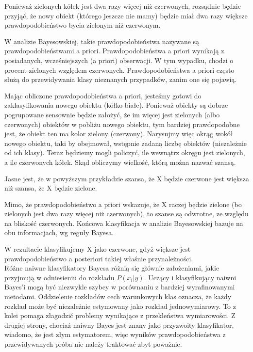 \documentclass[12pt,a4paper]{article}
\begin{document}
            Ponieważ zielonych kółek jest dwa razy więcej niż czerwonych, rozsądnie będzie przyjąć, że nowy obiekt (którego jeszcze nie mamy) będzie miał dwa razy większe prawdopodobieństwo bycia zielonym niż czerwonym.
            
            W analizie Bayesowskiej, takie prawdopodobieństwa nazywane są prawdopodobieństwami a priori. Prawdopodobieństwa a priori wynikają z posiadanych, wcześniejszych (a priori) obserwacji. W tym wypadku, chodzi o procent zielonych względem czerwonych. Prawdopodobieństwa a priori często służą do przewidywania klasy nieznanych przypadków, zanim one się pojawią.
            
            Mając obliczone prawdopodobieństwa a priori, jesteśmy gotowi do zaklasyfikowania nowego obiektu (kółko białe). Ponieważ obiekty są dobrze pogrupowane sensownie będzie założyć, że im więcej jest zielonych (albo czerwonych) obiektów w pobliżu nowego obiektu, tym bardziej prawdopodobne jest, że obiekt ten ma kolor zielony (czerwony). Narysujmy więc okrąg wokół nowego obiektu, taki by obejmował, wstępnie zadaną liczbę obiektów (niezależnie od ich klasy). Teraz będziemy mogli policzyć, ile wewnątrz okręgu jest zielonych, a ile czerwonych kółek. Skąd obliczymy wielkość, którą można nazwać szansą.
            
            Jasne jest, że w powyższym przykładzie szansa, że X będzie czerwone jest większa niż szansa, że X będzie zielone.
            
            Mimo, że prawdopodobieństwo a priori wskazuje, że X raczej będzie zielone (bo zielonych jest dwa razy więcej niż czerwonych), to szanse są odwrotne, ze względu na bliskość czerwonych. Końcowa klasyfikacja w analizie Bayesowskiej bazuje na obu informacjach, wg reguły Bayesa.
            
            W rezultacie klasyfikujemy X jako czerwone, gdyż większe jest prawdopodobieństwo a posteriori takiej właśnie przynależności.\\
            
	        Różne naiwne klasyfikatory Bayesa różnią się głównie założeniami, jakie przyjmują w odniesieniu do rozkładu $P(x_{i}|y)$.
	        Uczący i klasyfikujący naiwni Bayes'i mogą być niezwykle szybcy w porównaniu z bardziej wyrafinowanymi metodami. Oddzielenie rozkładów cech warunkowych klas oznacza, że każdy rozkład może być niezależnie estymowany jako rozkład jednowymiarowy. To z kolei pomaga złagodzić problemy wynikające z przekleństwa wymiarowości.
            Z drugiej strony, chociaż naiwny Bayes jest znany jako przyzwoity klasyfikator, wiadomo, że jest złym estymatorem, więc wyników prawdopodobieństwa z przewidywanych próba nie należy traktować zbyt poważnie.
            
\end{document}
